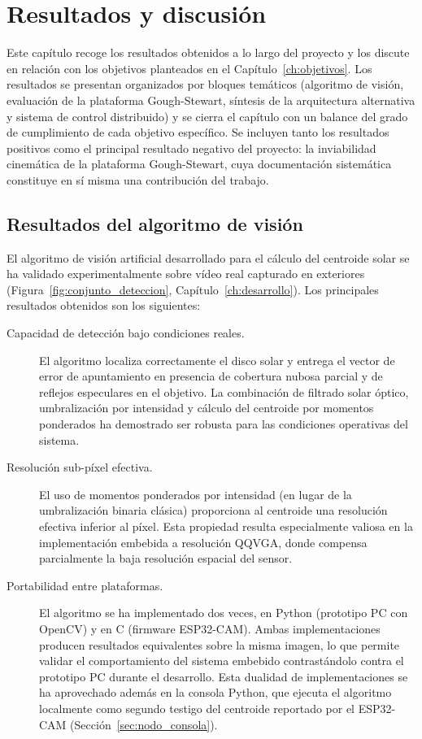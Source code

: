 \chapter{Resultados y discusión}
\label{ch:resultados}


Este capítulo recoge los resultados obtenidos a lo largo del proyecto y los discute en relación con los objetivos planteados en el Capítulo~\ref{ch:objetivos}. Los resultados se presentan organizados por bloques temáticos (algoritmo de visión, evaluación de la plataforma Gough-Stewart, síntesis de la arquitectura alternativa y sistema de control distribuido) y se cierra el capítulo con un balance del grado de cumplimiento de cada objetivo específico. Se incluyen tanto los resultados positivos como el principal resultado negativo del proyecto: la inviabilidad cinemática de la plataforma Gough-Stewart, cuya documentación sistemática constituye en sí misma una contribución del trabajo.

\section{Resultados del algoritmo de visión}
\label{sec:res_vision}

El algoritmo de visión artificial desarrollado para el cálculo del centroide solar se ha validado experimentalmente sobre vídeo real capturado en exteriores (Figura~\ref{fig:conjunto_deteccion}, Capítulo~\ref{ch:desarrollo}). Los principales resultados obtenidos son los siguientes:

\begin{description}

\item[Capacidad de detección bajo condiciones reales.] El algoritmo localiza correctamente el disco solar y entrega el vector de error de apuntamiento en presencia de cobertura nubosa parcial y de reflejos especulares en el objetivo. La combinación de filtrado solar óptico, umbralización por intensidad y cálculo del centroide por momentos ponderados ha demostrado ser robusta para las condiciones operativas del sistema.

\item[Resolución sub-píxel efectiva.] El uso de momentos ponderados por intensidad (en lugar de la umbralización binaria clásica) proporciona al centroide una resolución efectiva inferior al píxel. Esta propiedad resulta especialmente valiosa en la implementación embebida a resolución QQVGA, donde compensa parcialmente la baja resolución espacial del sensor.

\item[Portabilidad entre plataformas.] El algoritmo se ha implementado dos veces, en Python (prototipo PC con OpenCV) y en C (firmware ESP32-CAM). Ambas implementaciones producen resultados equivalentes sobre la misma imagen, lo que permite validar el comportamiento del sistema embebido contrastándolo contra el prototipo PC durante el desarrollo. Esta dualidad de implementaciones se ha aprovechado además en la consola Python, que ejecuta el algoritmo localmente como segundo testigo del centroide reportado por el ESP32-CAM (Sección~\ref{sec:nodo_consola}).

\end{description}

